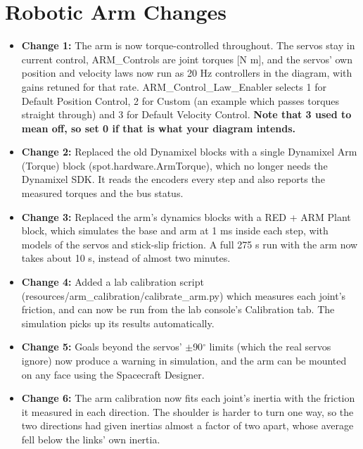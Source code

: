 \documentclass[11pt]{article}
\begin{document}
\section*{\textcolor{primaryColor}{Robotic Arm Changes}}
\begin{itemize}[label={\textcolor{primaryColor}{\textbullet}}]
    \item \textbf{Change 1:} The arm is now torque-controlled throughout. The servos stay in current control, ARM\_Controls are joint torques [N m], and the servos' own position and velocity laws now run as 20 Hz controllers in the diagram, with gains retuned for that rate. ARM\_Control\_Law\_Enabler selects 1 for Default Position Control, 2 for Custom (an example which passes torques straight through) and 3 for Default Velocity Control. \textbf{Note that 3 used to mean off, so set 0 if that is what your diagram intends.}
    \item \textbf{Change 2:} Replaced the old Dynamixel blocks with a single Dynamixel Arm (Torque) block (spot.hardware.ArmTorque), which no longer needs the Dynamixel SDK. It reads the encoders every step and also reports the measured torques and the bus status.
    \item \textbf{Change 3:} Replaced the arm's dynamics blocks with a RED + ARM Plant block, which simulates the base and arm at 1 ms inside each step, with models of the servos and stick-slip friction. A full 275 s run with the arm now takes about 10 s, instead of almost two minutes.
    \item \textbf{Change 4:} Added a lab calibration script (resources/arm\_calibration/calibrate\_arm.py) which measures each joint's friction, and can now be run from the lab console's Calibration tab. The simulation picks up its results automatically.
    \item \textbf{Change 5:} Goals beyond the servos' $\pm$90$^\circ$ limits (which the real servos ignore) now produce a warning in simulation, and the arm can be mounted on any face using the Spacecraft Designer.
    \item \textbf{Change 6:} The arm calibration now fits each joint's inertia with the friction it measured in each direction. The shoulder is harder to turn one way, so the two directions had given inertias almost a factor of two apart, whose average fell below the links' own inertia.
\end{itemize}

\end{document}
